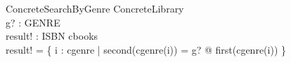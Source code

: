 \documentclass{article}
\begin{document}
\begin{schema}{ConcreteSearchByGenre}
  \Xi ConcreteLibrary \\
  g? : GENRE \\
  result! : \power ISBN
\where
  \ran cbooks \neq \emptyset \\
  result! = \{ i : \dom cgenre | second(cgenre(i)) = g? @ first(cgenre(i)) \}
\end{schema}
\end{document}
